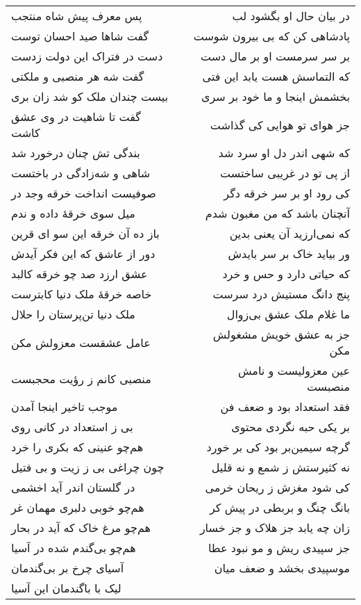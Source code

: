 \begin{center}
\begin{longtable}{l p{0.5cm} r}
\\
پس معرف پیش شاه منتجب
&&
در بیان حال او بگشود لب
\\
گفت شاها صید احسان توست
&&
پادشاهی کن که بی بیرون شوست
\\
دست در فتراک این دولت زدست
&&
بر سر سرمست او بر مال دست
\\
گفت شه هر منصبی و ملکتی
&&
که التماسش هست یابد این فتی
\\
بیست چندان ملک کو شد زان بری
&&
بخشمش اینجا و ما خود بر سری
\\
گفت تا شاهیت در وی عشق کاشت
&&
جز هوای تو هوایی کی گذاشت
\\
بندگی تش چنان درخورد شد
&&
که شهی اندر دل او سرد شد
\\
شاهی و شه‌زادگی در باختست
&&
از پی تو در غریبی ساختست
\\
صوفیست انداخت خرقه وجد در
&&
کی رود او بر سر خرقه دگر
\\
میل سوی خرقهٔ داده و ندم
&&
آنچنان باشد که من مغبون شدم
\\
باز ده آن خرقه این سو ای قرین
&&
که نمی‌ارزید آن یعنی بدین
\\
دور از عاشق که این فکر آیدش
&&
ور بیاید خاک بر سر بایدش
\\
عشق ارزد صد چو خرقه کالبد
&&
که حیاتی دارد و حس و خرد
\\
خاصه خرقهٔ ملک دنیا کابترست
&&
پنج دانگ مستیش درد سرست
\\
ملک دنیا تن‌پرستان را حلال
&&
ما غلام ملک عشق بی‌زوال
\\
عامل عشقست معزولش مکن
&&
جز به عشق خویش مشغولش مکن
\\
منصبی کانم ز رؤیت محجبست
&&
عین معزولیست و نامش منصبست
\\
موجب تاخیر اینجا آمدن
&&
فقد استعداد بود و ضعف فن
\\
بی ز استعداد در کانی روی
&&
بر یکی حبه نگردی محتوی
\\
هم‌چو عنینی که بکری را خرد
&&
گرچه سیمین‌بر بود کی بر خورد
\\
چون چراغی بی ز زیت و بی فتیل
&&
نه کثیرستش ز شمع و نه قلیل
\\
در گلستان اندر آید اخشمی
&&
کی شود مغزش ز ریحان خرمی
\\
هم‌چو خوبی دلبری مهمان غر
&&
بانگ چنگ و بربطی در پیش کر
\\
هم‌چو مرغ خاک که آید در بحار
&&
زان چه یابد جز هلاک و جز خسار
\\
هم‌چو بی‌گندم شده در آسیا
&&
جز سپیدی ریش و مو نبود عطا
\\
آسیای چرخ بر بی‌گندمان
&&
موسپیدی بخشد و ضعف میان
\\
لیک با باگندمان این آسیا

\end{longtable}
\end{center}

